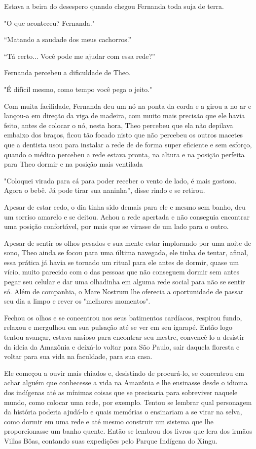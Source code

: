 Estava a beira do desespero quando chegou Fernanda toda suja de terra.

"O que aconteceu? Fernanda."

``Matando a saudade dos meus cachorros.''

``Tá certo... Você pode me ajudar com essa rede?''

Fernanda percebeu a dificuldade de Theo.

"É difícil mesmo, como tempo você pega o jeito."

Com muita facilidade, Fernanda deu um nó na ponta da corda e a girou a
no ar e lançou-a em direção da viga de madeira, com muito mais precisão
que ele havia feito, antes de colocar o nó, nesta hora, Theo percebeu
que ela não depilava embaixo dos braços, ficou tão focado nisto que não
percebeu os outros macetes que a dentista usou para instalar a rede de
de forma super eficiente e sem esforço, quando o médico percebeu a rede
estava pronta, na altura e na posição perfeita para Theo dormir e na
posição mais ventilada

"Coloquei virada para cá para poder receber o vento de lado, é mais
gostoso. Agora o bebê. Já pode tirar sua naninha'', disse rindo e se
retirou.

Apesar de estar cedo, o dia tinha sido demais para ele e mesmo sem
banho, deu um sorriso amarelo e se deitou. Achou a rede apertada e não
conseguia encontrar uma posição confortável, por mais que se virasse de
um lado para o outro.

Apesar de sentir os olhos pesados e sua mente estar implorando por uma
noite de sono, Theo ainda se focou para uma última navegada, ele tinha
de tentar, afinal, essa prática já havia se tornado um ritual para ele
antes de dormir, quase um vício, muito parecido com o das pessoas que
não conseguem dormir sem antes pegar seu celular e dar uma olhadinha em
alguma rede social para não se sentir só. Além de companhia, o Mare
Nostrum lhe oferecia a oportunidade de passar seu dia a limpo e rever os
"melhores momentos".

Fechou os olhos e se concentrou nos seus batimentos cardíacos, respirou
fundo, relaxou e mergulhou em sua pulsação até se ver em seu igarapé.
Então logo tentou avançar, estava ansioso para encontrar seu mestre,
convencê-lo a desistir da ideia da Amazônia e deixá-lo voltar para São
Paulo, sair daquela floresta e voltar para sua vida na faculdade, para
sua casa.

Ele começou a ouvir mais chiados e, desistindo de procurá-lo, se
concentrou em achar alguém que conhecesse a vida na Amazônia e lhe
ensinasse desde o idioma dos indígenas até as mínimas coisas que se
precisaria para sobreviver naquele mundo, como colocar uma rede, por
exemplo. Tentou se lembrar qual personagem da história poderia ajudá-lo
e quais memórias o ensinariam a se virar na selva, como dormir em uma
rede e até mesmo construir um sistema que lhe proporcionasse um banho
quente. Então se lembrou dos livros que lera dos irmãos Villas Bôas,
contando suas expedições pelo Parque Indígena do Xingu.

